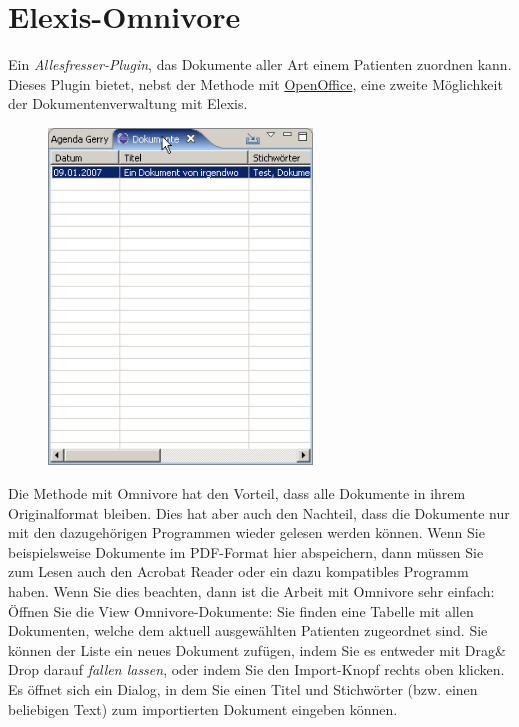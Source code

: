 
\section{Elexis-Omnivore}
Ein \textit{Allesfresser-Plugin}, das Dokumente aller Art einem Patienten zuordnen kann. Dieses Plugin bietet, nebst der Methode mit \href{http://www.elexis.ch/jp/index.php?option=content&task=view&id=107}{OpenOffice}, eine zweite Möglichkeit der Dokumentenverwaltung mit Elexis.

\begin{figure}
\includegraphics[width=7cm]{images/omnivore1}
\end{figure}

Die Methode mit Omnivore hat den Vorteil, dass alle Dokumente in ihrem Originalformat bleiben. Dies hat aber auch den Nachteil, dass die Dokumente nur mit den dazugehörigen Programmen wieder gelesen werden können. Wenn Sie beispielsweise Dokumente im PDF-Format  hier abspeichern, dann müssen Sie zum Lesen auch den Acrobat Reader oder ein dazu kompatibles Programm haben. Wenn Sie dies beachten, dann ist die Arbeit mit Omnivore sehr einfach:\\
\medskip
Öffnen Sie die View Omnivore-Dokumente:
Sie finden eine Tabelle mit allen Dokumenten, welche dem aktuell ausgewählten Patienten zugeordnet sind.
Sie können der Liste ein neues Dokument zufügen, indem Sie es entweder mit Drag\& Drop darauf \textit{fallen lassen}, oder indem Sie den Import-Knopf rechts oben klicken.
Es öffnet sich ein Dialog, in dem Sie einen Titel und Stichwörter (bzw. einen beliebigen Text) zum importierten  Dokument eingeben können.

